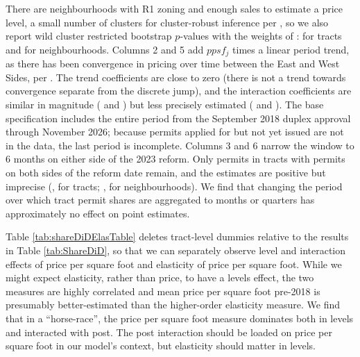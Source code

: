 \documentclass[12pt]{article}
\begin{document}
There are \sdNNbhd{} neighbourhoods with R1 zoning and enough sales to estimate a price level, a small number of clusters for cluster-robust inference per \textcite{CameronGelbachMiller2008,CameronMiller2015}, so we also report wild cluster restricted bootstrap $p$-values with the weights of \textcite{Webb2023}: \sdTractP{} for tracts and \sdNbhdP{} for neighbourhoods. Columns 2 and 5 add $ppsf_{j}$ times a linear period trend, as there has been convergence in pricing over time between the East and West Sides, per \textcite{SanghoonDaryl}. The trend coefficients are close to zero (there is not a trend towards convergence separate from the discrete jump), and the interaction coefficients are similar in magnitude (\sdTractTrendB{} and \sdNbhdTrendB) but less precisely estimated (\sdTractTrendP{} and \sdNbhdTrendP). The base specification includes the entire period from the September 2018 duplex approval through November 2026; because permits applied for but not yet issued are not in the data, the last period is incomplete. Columns 3 and 6 narrow the window to 6 months on either side of the 2023 reform. Only \sdWinPermits{} permits in tracts with permits on both sides of the reform date remain, and the estimates are positive but imprecise (\sdTractWinB, \sdTractWinP{} for tracts; \sdNbhdWinB, \sdNbhdWinP{} for neighbourhoods). We find that changing the period over which tract permit shares are aggregated to months or quarters has approximately no effect on point estimates.

\begin{table}[htbp]
	\centering
	\caption{\label{tab:ShareDiD}Duplex share of single family and duplex new-build permits on 33' lots now zoned R1, by area and twelve-month application period (equation \ref{eq:ShareDiD}), September 2018 to November 2026. All columns include area and period fixed effects; cells are weighted by permits. Standard errors clustered by area in parentheses; $^{*}$, $^{**}$, $^{***}$: significant at 10, 5, 1\% with clustered standard errors. Wild cluster restricted bootstrap $p$-values use \sdNBoot{} draws with Webb weights. Columns 3 and 6 use permit applications within 6 months of October 17, 2023; areas with permits on only one side drop out.}
	
\end{table}

Table \ref{tab:shareDiDElasTable} deletes tract-level dummies relative to
the results in Table \ref{tab:ShareDiD}, so that we can separately observe level and interaction effects of price per square foot and elasticity of price per square foot. While we might expect elasticity, rather than price, to have a levels effect, the two measures are highly correlated and mean price per square foot pre-2018 is presumably better-estimated than the higher-order elasticity measure. We find that in a ``horse-race'', the price per square foot measure dominates both in levels and interacted with post. The post interaction should be loaded on price per square foot in our model's context, but elasticity should matter in levels.
\end{document}
